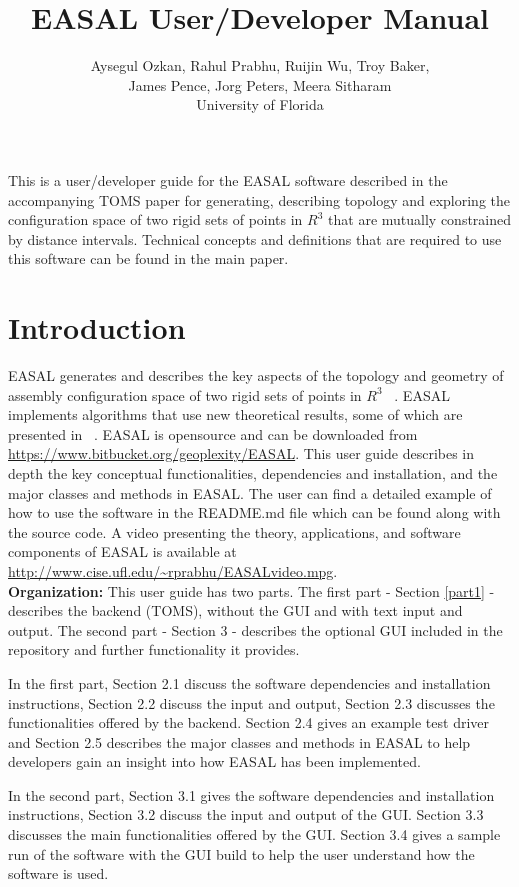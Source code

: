 \documentclass[10pt]{article}
\title{EASAL User/Developer Manual}
\author{Aysegul Ozkan, Rahul Prabhu, Ruijin Wu, Troy Baker, \\James Pence, Jorg
Peters, Meera Sitharam \\ University of Florida}
\begin{document}
\maketitle
This is a user/developer guide for the EASAL software described in the 
accompanying TOMS paper for generating, describing topology and exploring the 
configuration space of two rigid sets of points in $R^3$ that are mutually 
constrained by distance intervals. Technical concepts and definitions that are 
required to use this software can be found in the main paper.


\section{Introduction}
EASAL generates and describes the key aspects of the topology and geometry of
assembly configuration space of two rigid sets of points in $R^3$
~\cite{Sitharam:2012:EASAL, Ozkan2014MainEasal, Wu2014Virus}. EASAL implements
algorithms that use new theoretical results, some of which are presented in
~\cite{Ozkan2014MainEasal, SiGa:2010, Sitharam:2012:EASAL}.
EASAL is opensource and can be downloaded from
\url{https://www.bitbucket.org/geoplexity/EASAL}. This user guide describes in
depth the key conceptual functionalities, dependencies and installation, and
the major classes and methods in EASAL.  The user can find a detailed example
of how to use the software in the README.md file which can be found along with
the source code. A video presenting the theory, applications, and software
components of EASAL is available at
\url{http://www.cise.ufl.edu/~rprabhu/EASALvideo.mpg}.\\

\noindent\textbf{Organization:} 
This user guide has two parts. The first part - Section \ref{part1} - describes the backend (TOMS),
without the GUI and with text input and output. The second part - Section 3 - describes the optional GUI
included in the repository and further functionality it provides.


In the first part, Section 2.1 discuss the software dependencies and installation instructions, Section 2.2
discuss the input and output, Section 2.3 discusses the functionalities offered by the backend. Section 2.4
gives an example test driver and Section 2.5 describes the major classes and methods in EASAL to help
developers gain an insight into how EASAL has been implemented.

In the second part, Section 3.1 gives the software dependencies and installation instructions, Section 3.2
discuss the input and output of the GUI. Section 3.3 discusses the main functionalities offered by the GUI.
Section 3.4 gives a sample run of the software with the GUI build to help the user understand how the
software is used.
\end{document}
